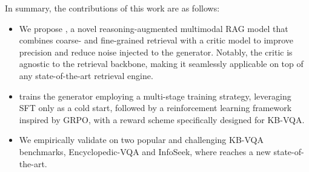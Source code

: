 \noindent In summary, the contributions of this work are as follows:
\begin{itemize}
    \item We propose \ours, a novel reasoning-augmented multimodal RAG model that combines coarse- and fine-grained retrieval with a critic model to improve precision and reduce noise injected to the generator. Notably, the critic is agnostic to the retrieval backbone, making it seamlessly applicable on top of any state-of-the-art retrieval engine.
   \item \ours trains the generator employing a multi-stage training strategy, leveraging SFT only as a cold start, followed by a reinforcement learning framework inspired by GRPO, with a reward scheme specifically designed for KB-VQA.
    \item We empirically validate \ours on two popular and challenging KB-VQA benchmarks, Encyclopedic-VQA and InfoSeek, where \ours reaches a new state-of-the-art.
\end{itemize}

